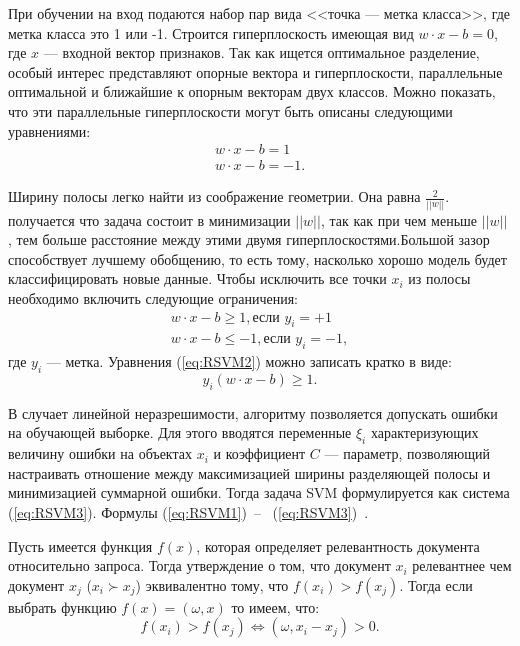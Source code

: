 При обучении на вход подаются набор пар вида <<точка --- метка класса>>, где метка класса это 1 или -1. Строится гиперплоскость имеющая вид $w\cdot x - b = 0$, где $x$ ---  входной вектор признаков. Так как ищется оптимальное разделение, особый интерес представляют опорные вектора и гиперплоскости, параллельные оптимальной и ближайшие к опорным векторам двух классов. 
Можно показать, что эти параллельные гиперплоскости могут быть описаны следующими уравнениями:
\begin{equation}
		\label{eq:RSVM1}
	\begin{aligned}
		w \cdot x - b = 1  \\
		w \cdot x - b = - 1 .
	\end{aligned}
\end{equation}

Ширину полосы легко найти из соображение геометрии. Она равна $\frac{2}{||w||}$. получается что задача состоит в минимизации $||w||$, так как при чем меньше  $||w||$ , тем больше расстояние между этими двумя гиперплоскостями.Большой зазор способствует лучшему обобщению, то есть тому, насколько хорошо модель
будет классифицировать новые данные. Чтобы исключить все точки $x_i$ из полосы необходимо включить следующие ограничения:
\begin{equation}
	\label{eq:RSVM2}
	\begin{aligned}
	w \cdot x - b \geq 1, \text{если $y_i = +1$}  \\
	w \cdot x - b \leq -1, \text{если $y_i = -1$} ,
	\end{aligned}
\end{equation}
где $y_i$ --- метка.
Уравнения (\ref{eq:RSVM2}) можно записать кратко в виде:
\begin{equation}
	\label{eq:RSVM3}
	y_i(w \cdot x - b) \geq 1.
\end{equation}

В случает линейной неразрешимости, алгоритму позволяется допускать ошибки на обучающей выборке. Для этого вводятся переменные $\xi_{i}$ характеризующих величину ошибки на объектах $x_i$ и коэффициент $C$ --- параметр, позволяющий настраивать отношение между максимизацией ширины разделяющей полосы и минимизацией суммарной ошибки. Тогда задача SVM формулируется как система (\ref{eq:RSVM3}). Формулы (\ref{eq:RSVM1})~--~ (\ref{eq:RSVM3})~\cite{ML_no_wors}.

Пусть имеется функция $f(x)$, которая определяет релевантность документа относительно запроса. Тогда утверждение о том, что документ $x_{i}$ релевантнее чем документ $x_{j}$  ($x_{i} \succ x_{j}$)  эквивалентно тому, что $f(x_{i}) > f(x_{j})$. Тогда если выбрать функцию $f(x)=(\omega, x)$ то имеем, что:
\[
	f(x_{i}) > f(x_{j}) \iff (\omega, x_{i} - x_{j}) > 0.
\]

